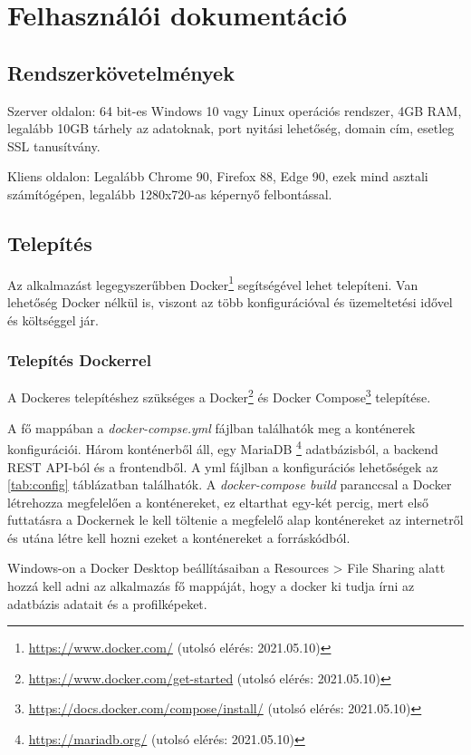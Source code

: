 \chapter{Felhasználói dokumentáció} %
\label{ch:user}

\section{Rendszerkövetelmények}
Szerver oldalon: 64 bit-es Windows 10 vagy Linux operációs rendszer, 4GB RAM, legalább 10GB tárhely az adatoknak, port nyitási lehetőség, domain cím, esetleg SSL tanusítvány.

Kliens oldalon: Legalább Chrome 90, Firefox 88, Edge 90, ezek mind asztali számítógépen, legalább 1280x720-as képernyő felbontással.

\section{Telepítés}

Az alkalmazást legegyszerűbben Docker\footnote{\url{https://www.docker.com/} (utolsó elérés: 2021.05.10)} segítségével lehet telepíteni. Van lehetőség Docker nélkül is, viszont az több konfigurációval és üzemeltetési idővel és költséggel jár.

\subsection{Telepítés Dockerrel}

A Dockeres telepítéshez szükséges a Docker\footnote{\url{https://www.docker.com/get-started} (utolsó elérés: 2021.05.10)} és Docker Compose\footnote{\url{https://docs.docker.com/compose/install/} (utolsó elérés: 2021.05.10)} telepítése.

A fő mappában a \textit{docker-compse.yml} fájlban találhatók meg a konténerek konfigurációi. Három konténerből áll, egy MariaDB \footnote{\url{https://mariadb.org/} (utolsó elérés: 2021.05.10)} adatbázisból, a backend REST API-ból és a frontendből.
A yml fájlban a konfigurációs lehetőségek az \ref{tab:config} táblázatban találhatók. A \textit{docker-compose build} paranccsal a Docker létrehozza megfelelően a konténereket, ez eltarthat egy-két percig, mert első futtatásra a Dockernek le kell töltenie a megfelelő alap konténereket az internetről és utána létre kell hozni ezeket a konténereket a forráskódból.

Windows-on a Docker Desktop beállításaiban a Resources > File Sharing alatt hozzá kell adni az alkalmazás fő mappáját, hogy a docker ki tudja írni az adatbázis adatait és a profilképeket.

